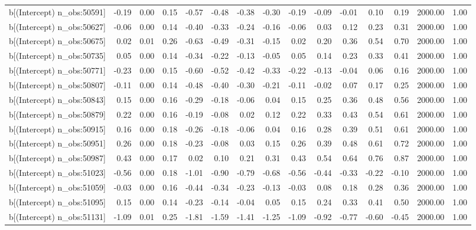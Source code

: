 \begin{table}[ht]
\begin{tabular}{rrrrrrrrrrrrrrr}
  b[(Intercept) n\_obs:50591] & -0.19 & 0.00 & 0.15 & -0.57 & -0.48 & -0.38 & -0.30 & -0.19 & -0.09 & -0.01 & 0.10 & 0.19 & 2000.00 & 1.00 \\ 
  b[(Intercept) n\_obs:50627] & -0.06 & 0.00 & 0.14 & -0.40 & -0.33 & -0.24 & -0.16 & -0.06 & 0.03 & 0.12 & 0.23 & 0.31 & 2000.00 & 1.00 \\ 
  b[(Intercept) n\_obs:50675] & 0.02 & 0.01 & 0.26 & -0.63 & -0.49 & -0.31 & -0.15 & 0.02 & 0.20 & 0.36 & 0.54 & 0.70 & 2000.00 & 1.00 \\ 
  b[(Intercept) n\_obs:50735] & 0.05 & 0.00 & 0.14 & -0.34 & -0.22 & -0.13 & -0.05 & 0.05 & 0.14 & 0.23 & 0.33 & 0.41 & 2000.00 & 1.00 \\ 
  b[(Intercept) n\_obs:50771] & -0.23 & 0.00 & 0.15 & -0.60 & -0.52 & -0.42 & -0.33 & -0.22 & -0.13 & -0.04 & 0.06 & 0.16 & 2000.00 & 1.00 \\ 
  b[(Intercept) n\_obs:50807] & -0.11 & 0.00 & 0.14 & -0.48 & -0.40 & -0.30 & -0.21 & -0.11 & -0.02 & 0.07 & 0.17 & 0.25 & 2000.00 & 1.00 \\ 
  b[(Intercept) n\_obs:50843] & 0.15 & 0.00 & 0.16 & -0.29 & -0.18 & -0.06 & 0.04 & 0.15 & 0.25 & 0.36 & 0.48 & 0.56 & 2000.00 & 1.00 \\ 
  b[(Intercept) n\_obs:50879] & 0.22 & 0.00 & 0.16 & -0.19 & -0.08 & 0.02 & 0.12 & 0.22 & 0.33 & 0.43 & 0.54 & 0.61 & 2000.00 & 1.00 \\ 
  b[(Intercept) n\_obs:50915] & 0.16 & 0.00 & 0.18 & -0.26 & -0.18 & -0.06 & 0.04 & 0.16 & 0.28 & 0.39 & 0.51 & 0.61 & 2000.00 & 1.00 \\ 
  b[(Intercept) n\_obs:50951] & 0.26 & 0.00 & 0.18 & -0.23 & -0.08 & 0.03 & 0.15 & 0.26 & 0.39 & 0.48 & 0.61 & 0.72 & 2000.00 & 1.00 \\ 
  b[(Intercept) n\_obs:50987] & 0.43 & 0.00 & 0.17 & 0.02 & 0.10 & 0.21 & 0.31 & 0.43 & 0.54 & 0.64 & 0.76 & 0.87 & 2000.00 & 1.00 \\ 
  b[(Intercept) n\_obs:51023] & -0.56 & 0.00 & 0.18 & -1.01 & -0.90 & -0.79 & -0.68 & -0.56 & -0.44 & -0.33 & -0.22 & -0.10 & 2000.00 & 1.00 \\ 
  b[(Intercept) n\_obs:51059] & -0.03 & 0.00 & 0.16 & -0.44 & -0.34 & -0.23 & -0.13 & -0.03 & 0.08 & 0.18 & 0.28 & 0.36 & 2000.00 & 1.00 \\ 
  b[(Intercept) n\_obs:51095] & 0.15 & 0.00 & 0.14 & -0.23 & -0.14 & -0.04 & 0.05 & 0.15 & 0.24 & 0.33 & 0.41 & 0.50 & 2000.00 & 1.00 \\ 
  b[(Intercept) n\_obs:51131] & -1.09 & 0.01 & 0.25 & -1.81 & -1.59 & -1.41 & -1.25 & -1.09 & -0.92 & -0.77 & -0.60 & -0.45 & 2000.00 & 1.00 \\ 

\end{tabular}
\end{table}

